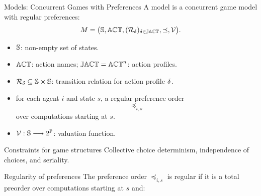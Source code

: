 \documentclass[aspectratio=169,10pt]{beamer}
\begin{document}
\begin{frame}{Models: Concurrent Games with Preferences}
  A model is a concurrent game model with regular preferences:
  \[
    M = \big(\mathbb{S},\mathbb{ACT},(\mathcal{R}_{\delta})_{\delta\in\mathbb{JACT}},\preceq,\mathcal{V}\big).
  \]

  \begin{itemize}
    \item $\mathbb{S}$: non-empty set of states.
    \item $\mathbb{ACT}$: action names; $\mathbb{JACT}=\mathbb{ACT}^n$: action profiles.
    \item $\mathcal{R}_{\delta}\subseteq \mathbb{S}\times \mathbb{S}$: transition relation for action profile $\delta$.
    \item for each agent $i$ and state $s$, a regular preference order
      \[
        \preceq_{i,s}
      \]
      over computations starting at $s$.
    \item $\mathcal{V}:\mathbb{S}\longrightarrow 2^{\mathbb{P}}$: valuation function.
  \end{itemize}

  \begin{block}{Constraints for game structures}
    Collective choice determinism, independence of choices, and seriality.
  \end{block}
\end{frame}

\begin{frame}{Regularity of preferences}
  The preference order $\preceq_{i,s}$ is regular if it is a total preorder over computations starting at $s$ and:

  \begin{itemize}
  \end{itemize}
\end{frame}
\end{document}

